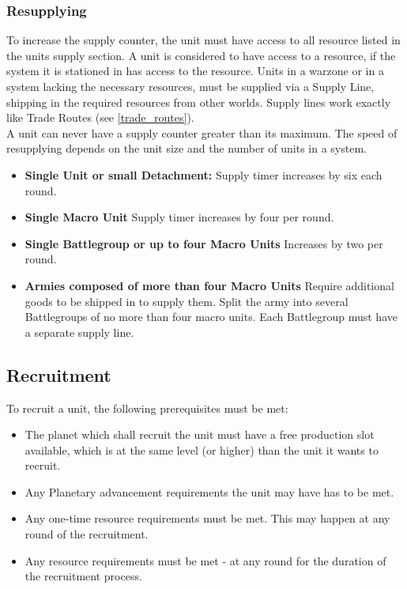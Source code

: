  \subsubsection{Resupplying}
 To increase the supply counter, the unit must have access to all resource listed in the units supply section.
 A unit is considered to have access to a resource, if the system it is stationed in has access to the resource. Units in a warzone or in a system lacking the necessary resources, must be supplied via a Supply Line, shipping in the required resources from other worlds. Supply lines work exactly like Trade Routes (see \ref{trade_routes}). \\
 A unit can never have a supply counter greater than its maximum. The speed of resupplying depends on the unit size and the number of units in a system.
  \begin{itemize}
    \item \textbf{Single Unit or small Detachment:} Supply timer increases by six each round.
    \item \textbf{Single Macro Unit} Supply timer increases by four per round.
    \item \textbf{Single Battlegroup or up to four Macro Units} Increases by two per round.
    \item \textbf{Armies composed of more than four Macro Units} Require additional goods to be shipped in to supply them. Split the army into several Battlegroups of no more than four macro units. Each Battlegroup must have a separate supply line.
     
 \end{itemize}
 
 \subsection{Recruitment} 
To recruit a unit, the following prerequisites must be met: 
\begin{itemize} 
    \item The planet which shall recruit the unit must have a free production slot available, which is at the same level (or higher) than the unit it wants to recruit. 
    \item Any Planetary advancement requirements the unit may have has to be met. 
    \item Any one-time resource requirements must be met. This may happen at any round of the recruitment. 
    \item Any resource requirements must be met - at any round for the duration of the recruitment process. 
\end{itemize} 

